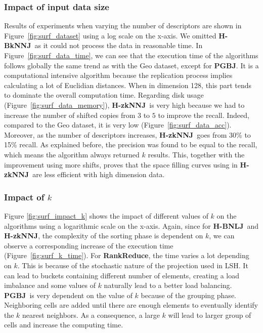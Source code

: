 \documentclass[10pt,journal,compsoc]{IEEEtran}
\newcommand{\TODO}[1]{\textcolor{red}{\textbf{[TODO:#1]}}}
\newcommand{\Z}{{\bf H-zkNNJ}}
\newcommand{\LSH}{{\bf RankReduce}}
\newcommand{\VO}{{\bf PGBJ}}
\newcommand{\HBNLJ}{{\bf H-BNLJ}}
\newcommand{\HBK}{{\bf H-BkNNJ}}
\begin{document}
\subsubsection{Impact of input data size}

Results of experiments when varying the number of descriptors are shown in Figure~\ref{fig:surf_dataset} using a log 
scale on the x-axis. We omitted \HBK~as it could not process the data in reasonable time.
In Figure~\ref{fig:surf_data_time}, we can see that the execution time of the algorithms follows globally 
the same trend as 
with the Geo dataset, except for \VO. It is a computational intensive algorithm because the replication process implies 
calculating a lot of Euclidian distances. When in dimension 128, this part tends to dominate the overall computation 
time. Regarding disk usage (Figure~\ref{fig:surf_data_memory}), \Z~is very high because  we had to increase the number 
of shifted copies from $3$ to $5$ to 
improve the recall. Indeed, compared to the Geo dataset, it is very low (Figure~\ref{fig:surf_data_acc}). Moreover, as 
the number of descriptors 
increases, \Z~goes from 30\% to 15\% recall. As explained before, the precision was found to be equal to the recall, which means the 
algorithm always returned $k$ results. This, together with the improvement using more shifts, proves that the 
space filling curves using in \Z~are less efficient with high dimension data. 

\subsubsection{Impact of $k$}

Figure \ref{fig:surf_impact_k} shows the impact of different values of $k$ on the algorithms using a logarithmic scale 
on the x-axis.
Again, since for \HBNLJ~and \Z, the complexity of the sorting phase is dependent on $k$, we can observe a 
corresponding increase of the execution time (Figure~\ref{fig:surf_k_time}). For 
\LSH, the time varies a lot depending on $k$. This is because of the stochastic nature of the projection used in 
LSH. It can lead to buckets containing different number of elements, creating a load imbalance and some values
of $k$ naturally lead to a better load balancing. \VO~is very dependent on the value of $k$ because of the grouping 
phase. Neighboring cells are added until there are enough elements to eventually identify the $k$ nearest neighbors. 
As a consequence, a large $k$ will lead to larger group of cells and increase the computing time. 
\end{document}
